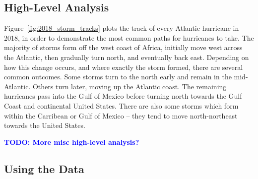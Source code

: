 \subsection{High-Level Analysis}

\par
Figure~\ref{fig:2018_storm_tracks} plots the track of every Atlantic hurricane in 2018, in order to demonstrate the most common paths for hurricanes to take.
The majority of storms form off the west coast of Africa, initially move west across the Atlantic, then gradually turn north, and eventually back east.
Depending on how this change occurs, and where exactly the storm formed, there are several common outcomes.
Some storms turn to the north early and remain in the mid-Atlantic.
Others turn later, moving up the Atlantic coast.
The remaining hurricanes pass into the Gulf of Mexico before turning north towards the Gulf Coast and continental United States.
There are also some storms which form within the Carribean or Gulf of Mexico -- they tend to move north-northeast towards the United States.

\par
\textcolor{blue}{\textbf{TODO: More misc high-level analysis?}}

\subsection{Using the Data}